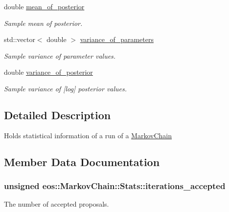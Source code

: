 \begin{DoxyCompactItemize}
double \hyperlink{structeos_1_1MarkovChain_1_1Stats_aa1f42fd0080e7dc2e2edcc8f97f78c46}{mean\_\-of\_\-posterior}
\begin{DoxyCompactList}\small\item\em Sample mean of posterior. \item\end{DoxyCompactList}\item 
std::vector$<$ double $>$ \hyperlink{structeos_1_1MarkovChain_1_1Stats_ad97dc1a916cfe3905ae776804ec57106}{variance\_\-of\_\-parameters}
\begin{DoxyCompactList}\small\item\em Sample variance of parameter values. \item\end{DoxyCompactList}\item 
double \hyperlink{structeos_1_1MarkovChain_1_1Stats_a42b880c3445149482c9b8516257dcd8a}{variance\_\-of\_\-posterior}
\begin{DoxyCompactList}\small\item\em Sample variance of \mbox{[}log\mbox{]} posterior values. \item\end{DoxyCompactList}\end{DoxyCompactItemize}


\subsection{Detailed Description}
Holds statistical information of a run of a \hyperlink{classeos_1_1MarkovChain}{MarkovChain} 

\subsection{Member Data Documentation}
\hypertarget{structeos_1_1MarkovChain_1_1Stats_a4a20f93d5d7f8a19ce9f59f3bb642563}{
\subsubsection[{iterations\_\-accepted}]{\setlength{\rightskip}{0pt plus 5cm}unsigned {\bf eos::MarkovChain::Stats::iterations\_\-accepted}}}
\label{structeos_1_1MarkovChain_1_1Stats_a4a20f93d5d7f8a19ce9f59f3bb642563}
The number of accepted proposals.

